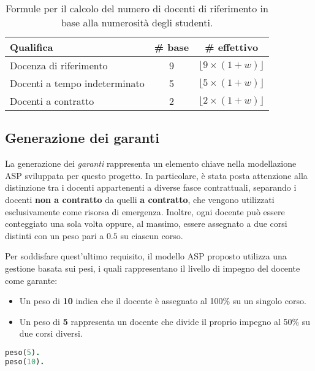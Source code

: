 \begin{table}[h]
    \centering
    \renewcommand{\arraystretch}{1.5}
    \begin{tabular}{|l|c|c|}
    \hline
    \textbf{Qualifica} & \textbf{\# base} & \textbf{\# effettivo} \\
    \hline
    Docenza di riferimento & 9 & $\lfloor 9 \times (1+w) \rfloor$ \\
    \hline
    Docenti a tempo indeterminato & 5 & $\lfloor 5 \times (1+w) \rfloor$ \\
    \hline
    Docenti a contratto & 2 & $\lfloor 2 \times (1+w) \rfloor$ \\
    \hline
    \end{tabular}
    \caption{Formule per il calcolo del numero di docenti di riferimento in base alla numerosità degli studenti.}
    \label{tab:formula-w}
\end{table}

\subsection{Generazione dei garanti}\label{sec:garanti}

La generazione dei \textit{garanti} rappresenta un elemento chiave nella modellazione ASP 
sviluppata per questo progetto. In particolare, è stata posta attenzione alla distinzione 
tra i docenti appartenenti a diverse fasce contrattuali, separando i docenti 
\textbf{non a contratto} da quelli \textbf{a contratto}, che vengono utilizzati 
esclusivamente come risorsa di emergenza.
Inoltre, ogni docente può essere conteggiato una sola volta oppure, al massimo, essere 
assegnato a due corsi distinti con un peso pari a $0.5$ su ciascun corso. 

Per soddisfare quest'ultimo requisito, il modello ASP proposto utilizza una gestione 
basata sui pesi, i quali rappresentano il livello di impegno del docente come garante:
\begin{itemize}
    \item Un peso di \textbf{10} indica che il docente è assegnato al 100\% su un singolo corso.
    \item Un peso di \textbf{5} rappresenta un docente che divide il proprio impegno al 50\% su due corsi diversi.
\end{itemize}

\begin{lstlisting}[language=prolog, caption=Generazione dei pesi.]
% Predicati di base per definire i pesi possibili.
peso(5).
peso(10).
\end{lstlisting}

